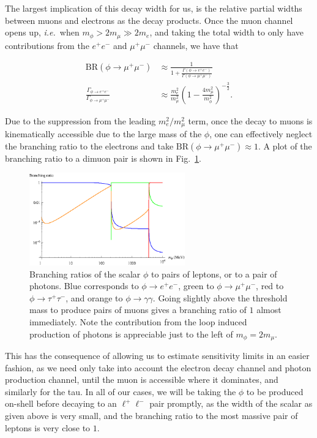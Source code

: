 The largest implication of this decay width for us, is the relative partial widths between muons and electrons as the decay products.
Once the muon channel opens up, {\em i.e.}\ when $m_\phi > 2 m_\mu \gg 2 m_e$, and taking the total width to only have contributions from the $e^+ e^-$ and $\mu^+ \mu^-$ channels, we have that

\begin{align}
    \textrm{BR}(\phi \rightarrow \mu^+ \mu^-) &\approx \frac{1}{1+\frac{\Gamma\left(\phi \rightarrow e^+ e^-\right)}{\Gamma\left(\phi \rightarrow \mu^+ \mu^-\right)}} \\
    \frac{\Gamma_{\phi \rightarrow e^+ e^-}}{\Gamma_{\phi \rightarrow \mu^+ \mu^-}} &\approx \frac{m_e^2}{m_\mu^2}\left(1-\frac{4m_\mu^2}{m_\phi^2}\right)^{-\frac{3}{2}}\textrm{.}
\end{align}

\noindent Due to the suppression from the leading $m_e^2/m_\mu^2$ term, once the decay to muons is kinematically accessible due to the large mass of the $\phi$, one can effectively neglect the branching ratio to the electrons and take $\textrm{BR}(\phi \rightarrow \mu^+ \mu^-) \approx 1$.
A plot of the branching ratio to a dimuon pair is shown in Fig.\ \ref{fig:br_phi}.

\begin{figure}[h]
    \centering
    \includegraphics[width = 0.6\textwidth]{Figures/misc/br_phi}
    \caption{Branching ratios of the scalar $\phi$ to pairs of leptons, or to a pair of photons. Blue corresponds to $\phi \rightarrow e^+ e^-$, green to $\phi \rightarrow \mu^+ \mu^-$, red to $\phi \rightarrow \tau^+ \tau^-$, and orange to $\phi \rightarrow \gamma \gamma$. Going slightly above the threshold mass to produce pairs of muons gives a branching ratio of $1$ almost immediately. Note the contribution from the loop induced production of photons is appreciable just to the left of $m_\phi = 2 m_\mu$.}
    \label{fig:br_phi}
\end{figure}

This has the consequence of allowing us to estimate sensitivity limits in an easier fashion, as we need only take into account the electron decay channel and photon production channel, until the muon is accessible where it dominates, and similarly for the tau.
In all of our cases, we will be taking the $\phi$ to be produced on-shell before decaying to an $\ell^+ \ell^-$ pair promptly, as the width of the scalar as given above is very small, and the branching ratio to the most massive pair of leptons is very close to $1$.

